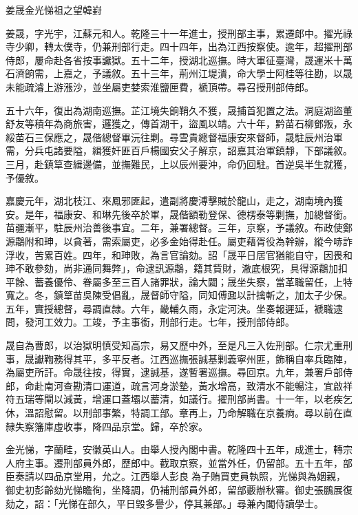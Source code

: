 
\begin{pinyinscope}
姜晟金光悌祖之望韓崶

姜晟，字光宇，江蘇元和人。乾隆三十一年進士，授刑部主事，累遷郎中。擢光祿寺少卿，轉太僕寺，仍兼刑部行走。四十四年，出為江西按察使。逾年，超擢刑部侍郎，屢命赴各省按事讞獄。五十二年，授湖北巡撫。時大軍征臺灣，晟運米十萬石濟餉需，上嘉之，予議敘。五十三年，荊州江堤潰，命大學士阿桂等往勘，以晟未能疏濬上游漲沙，並坐屬吏婪索淮鹽匣費，褫頂帶。尋召授刑部侍郎。

五十六年，復出為湖南巡撫。芷江境失餉鞘久不獲，晟捕首犯置之法。洞庭湖盜董舒友等積年為商旅害，邏獲之，傳首湖干，盜風以靖。六十年，黔苗石柳鄧叛，永綏苗石三保應之，晟偕總督畢沅往剿。尋雲貴總督福康安來督師，晟駐辰州治軍需，分兵屯諸要隘，緝獲奸匪百戶楊國安父子解京，詔嘉其治軍鎮靜，下部議敘。三月，赴鎮筸查緝邊備，並撫難民，上以辰州要沖，命仍回駐。首逆吳半生就獲，予優敘。

嘉慶元年，湖北枝江、來鳳邪匪起，遣副將慶溥擊賊於龍山，走之，湖南境內獲安。是年，福康安、和琳先後卒於軍，晟偕額勒登保、德楞泰等剿撫，加總督銜。苗疆漸平，駐辰州治善後事宜。二年，兼署總督。三年，京察，予議敘。布政使鄭源鸘附和珅，以貪著，需索屬吏，必多金始得赴任。屬吏藉胥役為幹辦，縱今哧詐浮收，苦累百姓。四年，和珅敗，為言官論劾。詔「晟平日居官猶能自守，因畏和珅不敢參劾，尚非通同舞弊」，命逮訊源鸘，籍其貲財，澈底根究，具得源鸘加扣平餘、蓄養優伶、眷屬多至三百人諸罪狀，論大闢；晟坐失察，當革職留任，上特寬之。冬，鎮筸苗吳陳受倡亂，晟督師守隘，同知傅鼐以計擒斬之，加太子少保。五年，實授總督，尋調直隸。六年，畿輔久雨，永定河決。坐奏報遲延，褫職逮問，發河工效力。工竣，予主事銜，刑部行走。七年，授刑部侍郎。

晟自為曹郎，以治獄明慎受知高宗，易又歷中外，至是凡三入佐刑部。仁宗尤重刑事，晟讞鞫務得其平，多平反者。江西巡撫張誠基剿義寧州匪，飾稱自率兵臨陣，為屬吏所訐。命晟往按，得實，逮誠基，遂暫署巡撫。尋回京。九年，兼署戶部侍郎，命赴南河查勘清口運道，疏言河身淤墊，黃水增高，致清水不能暢注，宜啟祥符五瑞等閘以減黃，增運口蓋壩以蓄清，如議行。擢刑部尚書。十一年，以老疾乞休，溫詔慰留。以刑部事繁，特調工部。章再上，乃命解職在京養痾。尋以前在直隸失察籓庫虛收事，降四品京堂。歸，卒於家。

金光悌，字蘭畦，安徽英山人。由舉人授內閣中書。乾隆四十五年，成進士，轉宗人府主事。遷刑部員外郎，歷郎中。截取京察，並當外任，仍留部。五十五年，部臣奏請以四品京堂用，允之。江西舉人彭良為子賄買吏員執照，光悌與為姻親，御史初彭齡劾光悌瞻徇，坐降調，仍補刑部員外郎，留部覈辦秋審。御史張鵬展復劾之，詔：「光悌在部久，平日毀多譽少，停其兼部。」尋兼內閣侍讀學士。


\end{pinyinscope}
